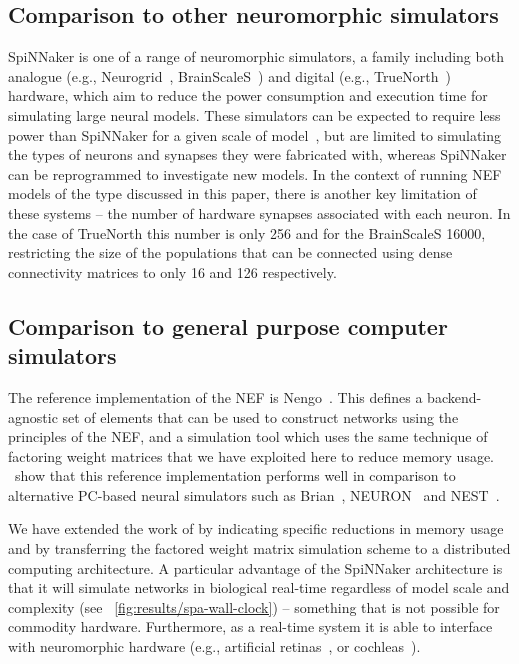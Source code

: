 \documentclass[conference]{IEEEtran}
\begin{document}
  \subsection{Comparison to other neuromorphic simulators}

  SpiNNaker is one of a range of neuromorphic simulators, a family including both analogue (e.g., Neurogrid~\parencite{Benjamin2014}, BrainScaleS~\parencite{Schemmel2010}) and digital (e.g., TrueNorth~\parencite{Merolla2014}) hardware, which aim to reduce the power consumption and execution time for simulating large neural models.
  These simulators can be expected to require less power than SpiNNaker for a given scale of model~\parencite{Stromatias2013}, but are limited to simulating the types of neurons and synapses they were fabricated with, whereas SpiNNaker can be reprogrammed to investigate new models.
  In the context of running NEF models of the type discussed in this paper, there is another key limitation of these systems -- the number of hardware synapses associated with each neuron. In the case of TrueNorth this number is only \num{256} and for the BrainScaleS \num{16000}, restricting the size of the populations that can be connected using dense connectivity matrices to only 16 and 126 respectively.

  \subsection{Comparison to general purpose computer simulators}

  The reference implementation of the NEF is Nengo~\parencite{Bekolay2014}.
  This defines a backend-agnostic set of elements that can be used to construct networks using the principles of the NEF, and a simulation tool which uses the same technique of factoring weight matrices that we have exploited here to reduce memory usage.
  \textcite*{Bekolay2014}\ show that this reference implementation performs well in comparison to alternative PC-based neural simulators such as Brian~\parencite{Goodman2009}, NEURON~\parencite{carnevale2006neuron} and NEST~\parencite{Gewaltig2007}.

  We have extended the work of \citeauthor*{Bekolay2014} by indicating specific reductions in memory usage and by transferring the factored weight matrix simulation scheme to a distributed computing architecture.
  A particular advantage of the SpiNNaker architecture is that it will simulate networks in biological real-time regardless of model scale and complexity (see \figurename~\ref{fig:results/spa-wall-clock}) -- something that is not possible for commodity hardware.
  Furthermore, as a real-time system it is able to interface with neuromorphic hardware (e.g., artificial retinas~\parencite{Lichtensteiner2008}, or cochleas~\parencite{Chan2007}).
\end{document}
